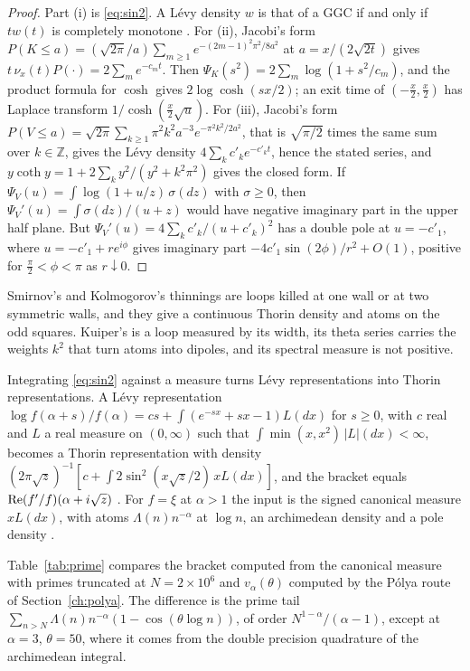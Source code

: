 \begin{proof}
Part (i) is \eqref{eq:sin2}. A L\'evy density $w$ is that of a GGC if and only if $tw(t)$ is completely monotone \cite{Bondesson}. For (ii), Jacobi's form $P(K\le a)=(\sqrt{2\pi}/a)\sum_{m\ge1}e^{-(2m-1)^2\pi^2/8a^2}$ at $a=x/(2\sqrt{2t})$ gives $t\,\nu_x(t)P(\cdot)=2\sum_me^{-c_mt}$. Then $\Psi_K(s^2)=2\sum_m\log(1+s^2/c_m)$, and the product formula for $\cosh$ gives $2\log\cosh(sx/2)$; an exit time of $(-\frac x2,\frac x2)$ has Laplace transform $1/\cosh(\frac x2\sqrt u)$. For (iii), Jacobi's form $P(V\le a)=\sqrt{2\pi}\sum_{k\ge1}\pi^2k^2a^{-3}e^{-\pi^2k^2/2a^2}$, that is $\sqrt{\pi/2}$ times the same sum over $k\in\mathbb Z$, gives the L\'evy density $4\sum_kc'_ke^{-c'_kt}$, hence the stated series, and $y\coth y=1+2\sum_k y^2/(y^2+k^2\pi^2)$ gives the closed form. If $\Psi_V(u)=\int\log(1+u/z)\,\sigma(dz)$ with $\sigma\ge0$, then $\Psi_V'(u)=\int\sigma(dz)/(u+z)$ would have negative imaginary part in the upper half plane. But $\Psi_V'(u)=4\sum_kc'_k/(u+c'_k)^2$ has a double pole at $u=-c'_1$, where $u=-c'_1+re^{i\phi}$ gives imaginary part $-4c'_1\sin(2\phi)/r^2+O(1)$, positive for $\frac\pi2<\phi<\pi$ as $r\downarrow0$. \qedhere
\end{proof}

Smirnov's and Kolmogorov's thinnings are loops killed at one wall or at two symmetric walls, and they give a continuous Thorin density and atoms on the odd squares. Kuiper's is a loop measured by its width, its theta series carries the weights $k^2$ that turn atoms into dipoles, and its spectral measure is not positive.

Integrating \eqref{eq:sin2} against a measure turns L\'evy representations into Thorin representations. A L\'evy representation $\log f(\alpha+s)/f(\alpha)=cs+\int(e^{-sx}+sx-1)L(dx)$ for $s\ge0$, with $c$ real and $L$ a real measure on $(0,\infty)$ such that $\int\min(x,x^2)\,|L|(dx)<\infty$, becomes a Thorin representation with density $(2\pi\sqrt z)^{-1}[c+\int2\sin^2(x\sqrt z/2)\,xL(dx)]$, and the bracket equals $\operatorname{Re}(f'/f)(\alpha+i\sqrt z)$ \cite[Theorem 8.2]{P17}. For $f=\xi$ at $\alpha>1$ the input is the signed canonical measure $xL(dx)$, with atoms $\Lambda(n)n^{-\alpha}$ at $\log n$, an archimedean density and a pole density \cite[Theorem 8.1]{P26}.

Table~\ref{tab:prime} compares the bracket computed from the canonical measure with primes truncated at $N=2\times10^6$ and $v_\alpha(\theta)$ computed by the P\'olya route of Section~\ref{ch:polya}.
 The difference is the prime tail $\sum_{n>N}\Lambda(n)n^{-\alpha}(1-\cos(\theta\log n))$, of order $N^{1-\alpha}/(\alpha-1)$, except at $\alpha=3$, $\theta=50$, where it comes from the double precision quadrature of the archimedean integral.

